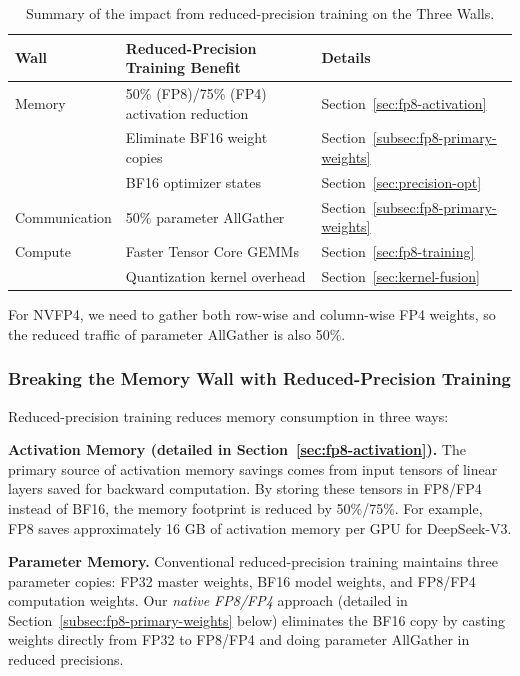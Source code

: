 \documentclass[10pt,logo,copyright]{nvidiatechreport}
\begin{document}
\begin{table}[ht]
\centering
\begin{threeparttable}
\caption{Summary of the impact from reduced-precision training on the Three Walls.}
\label{tab:fp8-impact-summary}
\begin{tabular}{lll}
\toprule
\textbf{Wall} & \textbf{Reduced-Precision Training Benefit} & \textbf{Details} \\
\midrule
Memory & 50\% (FP8)/75\% (FP4) activation reduction & Section~\ref{sec:fp8-activation} \\
        & Eliminate BF16 weight copies & Section~\ref{subsec:fp8-primary-weights} \\
        & BF16 optimizer states & Section~\ref{sec:precision-opt} \\
\midrule
Communication & 50\% parameter AllGather \tnote{1} & Section~\ref{subsec:fp8-primary-weights} \\
\midrule
Compute & Faster Tensor Core GEMMs & Section~\ref{sec:fp8-training} \\
        & Quantization kernel overhead & Section~\ref{sec:kernel-fusion} \\
\bottomrule
\end{tabular}
\begin{tablenotes}
    \footnotesize
    \item[1] For NVFP4, we need to gather both row-wise and column-wise FP4 weights, so the reduced traffic of parameter AllGather is also 50\%.
\end{tablenotes}
\end{threeparttable}
\end{table}

\subsubsection{Breaking the Memory Wall with Reduced-Precision Training}

Reduced-precision training reduces memory consumption in three ways:

\textbf{Activation Memory (detailed in Section~\ref{sec:fp8-activation}).} The primary source of activation memory savings comes from input tensors of linear layers saved for backward computation. By storing these tensors in FP8/FP4 instead of BF16, the memory footprint is reduced by 50\%/75\%. For example, FP8 saves approximately 16 GB of activation memory per GPU for DeepSeek-V3.

\textbf{Parameter Memory.} Conventional reduced-precision training maintains three parameter copies: FP32 master weights, BF16 model weights, and FP8/FP4 computation weights. Our \emph{native FP8/FP4} approach (detailed in Section~\ref{subsec:fp8-primary-weights} below) eliminates the BF16 copy by casting weights directly from FP32 to FP8/FP4 and doing parameter AllGather in reduced precisions.
\end{document}
